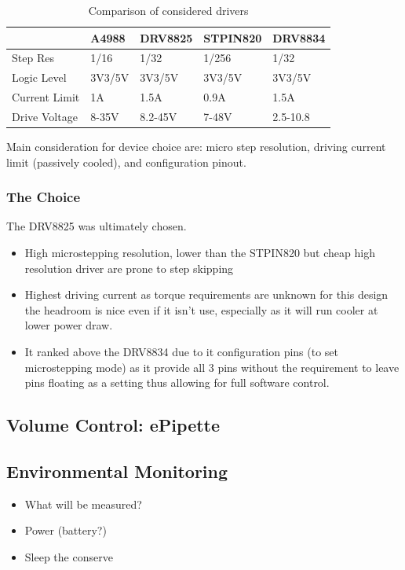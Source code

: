 \begin{table}[h]
    \centering
    \begin{tabular}{|l|l|l|l|l|}
        \hline
        \textbf{}     & \textbf{A4988} & \textbf{DRV8825} & \textbf{STPIN820} & \textbf{DRV8834} \\ \hline
        Step Res      & 1/16           & 1/32             & 1/256             & 1/32             \\ \hline
        Logic Level   & 3V3/5V         & 3V3/5V           & 3V3/5V            & 3V3/5V           \\ \hline
        Current Limit & 1A             & 1.5A             & 0.9A              & 1.5A             \\ \hline
        Drive Voltage & 8-35V          & 8.2-45V          & 7-48V             & 2.5-10.8         \\ \hline
    \end{tabular}
    \caption{Comparison of considered drivers}
\end{table}

Main consideration for device choice are: micro step resolution, driving current limit (passively cooled), and configuration pinout.

\subsubsection*{The Choice}
The DRV8825 was ultimately chosen.
\begin{itemize}
    \item High microstepping resolution, lower than the STPIN820 but cheap high resolution driver are prone to step skipping \cite{step_book}
    \item Highest driving current as torque requirements are unknown for this design the headroom is nice even if it isn't use, especially as it will run cooler at lower power draw.
    \item It ranked above the DRV8834 due to it configuration pins (to set microstepping mode) as it provide all 3 pins without the requirement to leave pins floating as a setting thus allowing for full software control.
\end{itemize}

\subsection{Volume Control: ePipette}

\subsection{Environmental Monitoring}
\begin{itemize} 
    \item What will be measured?
    \item Power (battery?)
    \item Sleep the conserve
\end{itemize}
